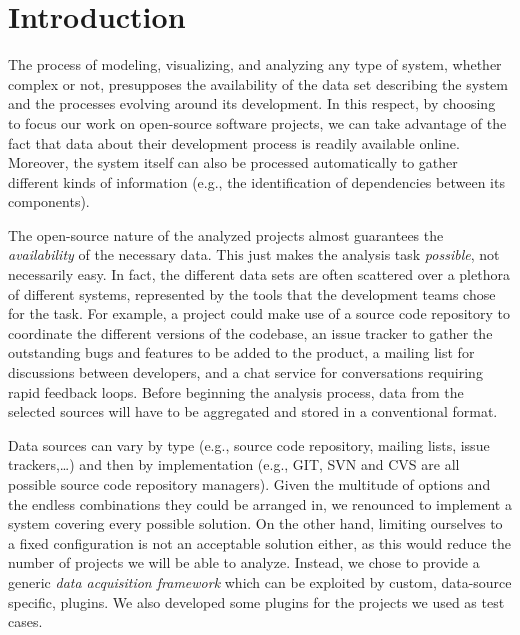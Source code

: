 
\section{Introduction}

The process of modeling, visualizing, and analyzing any type of system, whether complex or not, presupposes the availability of the data set describing the system and the processes evolving around its development. In this respect, by choosing to focus our work on open-source software projects, we can take advantage of the fact that data about their development process is readily available online. Moreover, the system itself can also be processed automatically to gather different kinds of information (e.g., the identification of dependencies between its components).

The open-source nature of the analyzed projects almost guarantees the \emph{availability} of the necessary data. This just makes the analysis task \emph{possible}, not necessarily easy. In fact, the different data sets are often scattered over a plethora of different systems, represented by the tools that the development teams chose for the task. For example, a project could make use of a source code repository to coordinate the different versions of the codebase, an issue tracker to gather the outstanding bugs and features to be added to the product, a mailing list for discussions between developers, and a chat service for conversations requiring rapid feedback loops. Before beginning the analysis process, data from the selected sources will have to be aggregated and stored in a conventional format.

Data sources can vary by type (e.g., source code repository, mailing lists, issue trackers,\ldots) and then by implementation (e.g., GIT, SVN and CVS are all possible source code repository managers). Given the multitude of options and the endless combinations they could be arranged in, we renounced to implement a system covering every possible solution. On the other hand, limiting ourselves to a fixed configuration is not an acceptable solution either, as this would reduce the number of projects we will be able to analyze. Instead, we chose to provide a generic \emph{data acquisition framework} which can be exploited by custom, data-source specific, plugins. We also developed some plugins for the projects we used as test cases.

